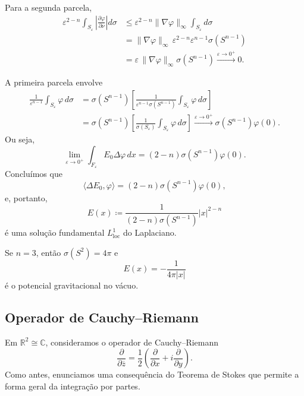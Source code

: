 \documentclass[../distribution_theory_notes.tex]{subfiles}
\begin{document}
Para a segunda parcela,
\begin{align*}
	\varepsilon^{2-n}
	\int_{S_{\varepsilon}}
	\left|\frac{\partial\varphi}{\partial\nu}\right|d\sigma
	 & \leq
	\varepsilon^{2-n}\|\nabla\varphi\|_{\infty}\int_{S_{\varepsilon}}d\sigma \\
	 & =\|\nabla\varphi\|_{\infty}\,
	\varepsilon^{2-n}\varepsilon^{n-1}\sigma(S^{n-1})                        \\
	 & =\varepsilon\,\|\nabla\varphi\|_{\infty}\sigma(S^{n-1})
	\stackrel{\varepsilon\to0^{+}}{\longrightarrow}0.
\end{align*}

A primeira parcela envolve
\begin{align*}
	\frac{1}{\varepsilon^{n-1}}\int_{S_{\varepsilon}}\varphi\,d\sigma
	 & =\sigma(S^{n-1})
	\left[
		\frac{1}{\varepsilon^{n-1}\sigma(S^{n-1})}
		\int_{S_{\varepsilon}}\varphi\,d\sigma
	\right]             \\
	 & =\sigma(S^{n-1})
	\left[
		\frac{1}{\sigma(S_{\varepsilon})}
		\int_{S_{\varepsilon}}\varphi\,d\sigma
		\right]
	\stackrel{\varepsilon\to0^{+}}{\longrightarrow}
	\sigma(S^{n-1})\varphi(0).
\end{align*}
Ou seja,
\[
	\lim_{\varepsilon\to0^{+}}
	\int_{F_{\varepsilon}}E_{0}\Delta\varphi\,dx
	=(2-n)\sigma(S^{n-1})\varphi(0).
\]
Concluímos que
\[
	\langle\Delta E_{0},\varphi\rangle
	=(2-n)\sigma(S^{n-1})\varphi(0),
\]
e, portanto,
\[
	E(x)\coloneqq
	\frac{1}{(2-n)\sigma(S^{n-1})}|x|^{2-n}
\]
é uma solução fundamental \(L_{\mathrm{loc}}^{1}\) do Laplaciano.

\begin{tcolorbox}[
		skin=enhanced,
		title=Observação,
		fonttitle=\bfseries,
		colframe=black,
		colbacktitle=cyan!75!white,
		colback=cyan!15,
		colbacklower=black,
		coltitle=black,
		drop fuzzy shadow,
	]
	Se \(n=3\), então \(\sigma(S^{2})=4\pi\) e
	\[
		E(x)=-\frac{1}{4\pi|x|}
	\]
	é o potencial gravitacional no vácuo.
\end{tcolorbox}

\subsection{Operador de Cauchy--Riemann}
Em \(\mathbb{R}^{2}\cong\mathbb{C}\), consideramos o operador de Cauchy--Riemann
\[
	\frac{\partial}{\partial\overline{z}}
	=\frac{1}{2}\left(
	\frac{\partial}{\partial x}
	+i\frac{\partial}{\partial y}
	\right).
\]
Como antes, enunciamos uma consequência do Teorema de Stokes que permite a forma geral da integração por partes.
\end{document}

